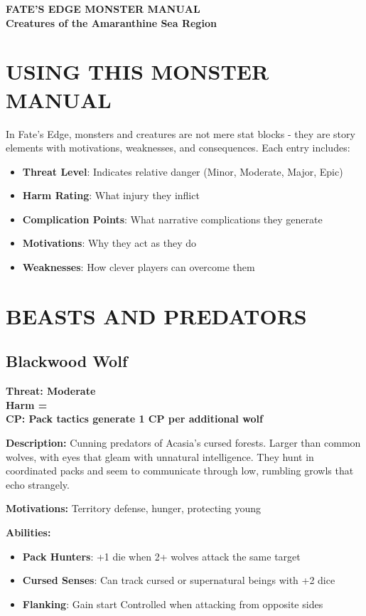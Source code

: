 \documentclass[12pt]{article}
\newcommand{\cp}[1]{\textbf{CP: #1}}
\newcommand{\harm}[1]{\textbf{Harm #1}}
\newcommand{\threat}[1]{\textbf{Threat: #1}}
\begin{document}
\begin{center}
{\LARGE \textbf{FATE'S EDGE MONSTER MANUAL}} \\
{\large \textbf{Creatures of the Amaranthine Sea Region}}
\end{center}

\section*{USING THIS MONSTER MANUAL}

In Fate's Edge, monsters and creatures are not mere stat blocks - they are story elements with motivations, weaknesses, and consequences. Each entry includes:
\begin{itemize}
\item \textbf{Threat Level}: Indicates relative danger (Minor, Moderate, Major, Epic)
\item \textbf{Harm Rating}: What injury they inflict
\item \textbf{Complication Points}: What narrative complications they generate
\item \textbf{Motivations}: Why they act as they do
\item \textbf{Weaknesses}: How clever players can overcome them
\end{itemize}

\section{BEASTS AND PREDATORS}

\subsection*{Blackwood Wolf}

\threat{Moderate} \\
\harm{=} \\
\cp{Pack tactics generate 1 CP per additional wolf}

\vspace{0.5em}
\textbf{Description:} Cunning predators of Acasia's cursed forests. Larger than common wolves, with eyes that gleam with unnatural intelligence. They hunt in coordinated packs and seem to communicate through low, rumbling growls that echo strangely.

\textbf{Motivations:} Territory defense, hunger, protecting young

\textbf{Abilities:}
\begin{itemize}
\item \textbf{Pack Hunters}: +1 die when 2+ wolves attack the same target
\item \textbf{Cursed Senses}: Can track cursed or supernatural beings with +2 dice
\item \textbf{Flanking}: Gain start Controlled when attacking from opposite sides
\end{itemize}
\end{document}

